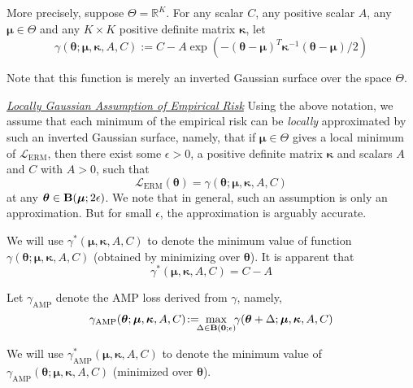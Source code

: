 \documentclass[final]{cvpr}
\begin{document}
More precisely, suppose $\Theta=\mathbb{R}^K$. For any scalar $C$, any positive scalar $A$, any $\boldsymbol{\mu}\in\Theta$ and any $K\times K$ positive definite matrix $\boldsymbol{\kappa}$, let
\begin{equation}
\gamma(\boldsymbol{\theta};\boldsymbol{\mu},\boldsymbol{\kappa},A,C)\!:=\!C\!-\!A\exp\left(-(\boldsymbol{\theta}\!-\!\boldsymbol{\mu})^T\boldsymbol{\kappa}^{-1}(\boldsymbol{\theta}\!-\!\boldsymbol{\mu})/2\right)
\end{equation}

Note that this function is merely an inverted Gaussian surface over the space $\Theta$. 

\noindent\underline{\em Locally Gaussian Assumption of Empirical Risk} Using the above notation, we assume that each minimum of the empirical risk can be {\em locally} approximated by such an inverted Gaussian surface, namely, that 
if $\boldsymbol{\mu}\in\Theta$ gives a local minimum of $\mathcal{L}_\mathrm{ERM}$, then there exist some $\epsilon>0$, a positive definite matrix $\boldsymbol{\kappa}$ and scalars $A$ and $C$ with $A>0$, such that
\begin{equation}
\mathcal{L}_\mathrm{ERM}(\boldsymbol{\theta})=\gamma(\boldsymbol{\theta};\boldsymbol{\mu},\boldsymbol{\kappa},A,C)
\end{equation}
at any $\boldsymbol{\theta}\in{\rm\bf B}(\boldsymbol{\mu};2\epsilon)$.
We note that in general, such an assumption is only an approximation. But for small $\epsilon$, the approximation is arguably accurate. 

We will use $\gamma^\ast(\boldsymbol{\mu},\boldsymbol{\kappa},A,C)$ to denote the minimum value of function $\gamma(\boldsymbol{\theta};\boldsymbol{\mu},\boldsymbol{\kappa},A,C)$ (obtained by minimizing over $\boldsymbol{\theta}$). It is apparent that 
\begin{equation}
\gamma^\ast(\boldsymbol{\mu},\boldsymbol{\kappa},A,C)=C-A
\end{equation}

Let $\gamma_\mathrm{AMP}$ denote the AMP loss derived from $\gamma$, namely,
\begin{equation}
\gamma_\mathrm{AMP}(\boldsymbol{\theta};\boldsymbol{\mu},\boldsymbol{\kappa},A,C)\!:=\!\!\!\max_{\Delta\in{\rm\bf B}(\boldsymbol{0};\epsilon)}\!\!\gamma(\boldsymbol{\theta}+\Delta;\boldsymbol{\mu},\boldsymbol{\kappa},A,C)
\end{equation}

We will use $\gamma^\ast_\mathrm{AMP}(\boldsymbol{\mu},\boldsymbol{\kappa},A,C)$ to denote the minimum value of $\gamma_\mathrm{AMP}(\boldsymbol{\theta};\boldsymbol{\mu},\boldsymbol{\kappa},A,C)$ (minimized over $\boldsymbol{\theta}$). 
\end{document}
